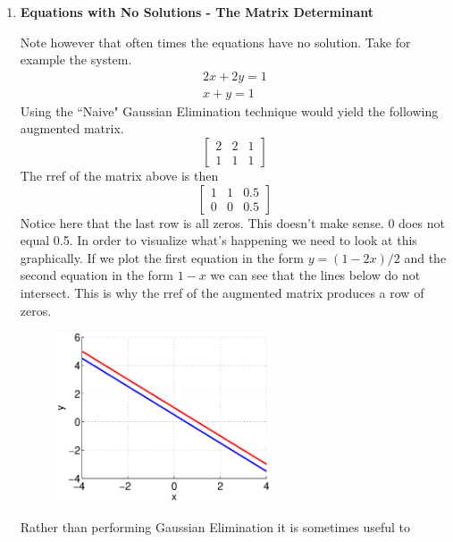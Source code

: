 \begin{enumerate}
\item {\bf Equations with No Solutions - The Matrix Determinant}

Note however that often times the equations have no solution. Take for
example the system. 
\begin{equation}
\begin{matrix} 2x + 2y = 1 \\
x+y = 1
\end{matrix}
\end{equation}
Using the ``Naive" Gaussian Elimination technique would yield the
following augmented matrix.
\begin{equation}
\begin{bmatrix}
2 & 2 & 1 \\
1 & 1 & 1
\end{bmatrix}
\end{equation}
The rref of the matrix above is then
\begin{equation}
\begin{bmatrix}
1 & 1 & 0.5 \\
0 & 0 & 0.5
\end{bmatrix}
\end{equation}
Notice here that the last row is all zeros. This doesn't make sense. 0
does not equal 0.5. In order to visualize what's happening we need to
look at this graphically. If we plot the first equation in the form
$y=(1-2x)/2$ and the second equation in the form $1-x$ we can see that
the lines below do not intersect. This is why the rref of the
augmented matrix produces a row of zeros. 
\begin{figure}[htb]
  \begin{center}
    \includegraphics[height=0.5\textwidth,width=0.6\textwidth]{Graphics/No_Solution}
  \end{center}
\end{figure}
Rather than performing Gaussian Elimination it is sometimes useful to

\end{enumerate}
